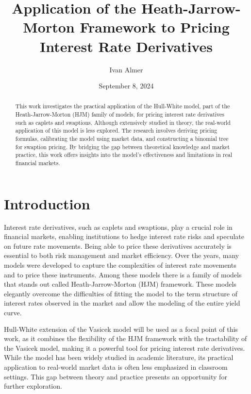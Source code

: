 \documentclass[titlepage, 12pt]{article}
\title{\textbf{Application of the Heath-Jarrow-Morton Framework to Pricing Interest Rate Derivatives}}
\author{Ivan Almer}
\affil{Master of Quantitative Finance and Risk Management\\Bocconi University\\Milan, Italy\vspace{0.5cm}\\Supervisor: Francesco Rotondi}
\date{September 8, 2024}
\begin{document}
	\maketitle
	
	\begin{abstract}
		This work investigates the practical application of the Hull-White model, part of the Heath-Jarrow-Morton (HJM) family of models, for pricing interest rate derivatives such as caplets and swaptions. Although extensively studied in theory, the real-world application of this model is less explored. The research involves deriving pricing formulas, calibrating the model using market data, and constructing a binomial tree for swaption pricing. By bridging the gap between theoretical knowledge and market practice, this work offers insights into the model's effectiveness and limitations in real financial markets.
	\end{abstract}
	
	\tableofcontents
	\newpage
	
	\section{Introduction}\label{introduction}
	
	Interest rate derivatives, such as caplets and swaptions, play a crucial
	role in financial markets, enabling institutions to hedge interest rate
	risks and speculate on future rate movements. Being able to price these
	derivatives accurately is essential to both risk management and market
	efficiency. Over the years, many models were developed to capture the
	complexities of interest rate movements and to price these instruments.
	Among these models there is a family of models that stands out called
	Heath-Jarrow-Morton (HJM) framework. These models elegantly overcome the
	difficulties of fitting the model to the term structure of interest
	rates observed in the market and allow the modeling of the entire yield
	curve.
	
	Hull-White extension of the Vasicek model will be used as a focal point
	of this work, as it combines the flexibility of the HJM framework with
	the tractability of the Vasicek model, making it a powerful tool for
	pricing interest rate derivatives. While the model has been widely
	studied in academic literature, its practical application to real-world
	market data is often less emphasized in classroom settings. This gap
	between theory and practice presents an opportunity for further
	exploration.
	
\end{document}
